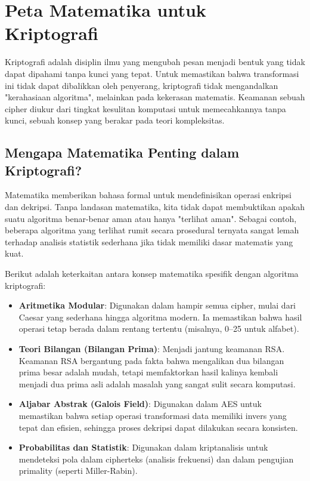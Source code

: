 \section{Peta Matematika untuk Kriptografi}

Kriptografi adalah disiplin ilmu yang mengubah pesan menjadi bentuk yang tidak dapat dipahami tanpa kunci yang tepat. Untuk memastikan bahwa transformasi ini tidak dapat dibalikkan oleh penyerang, kriptografi tidak mengandalkan "kerahasiaan algoritma", melainkan pada kekerasan matematis. Keamanan sebuah cipher diukur dari tingkat kesulitan komputasi untuk memecahkannya tanpa kunci, sebuah konsep yang berakar pada teori kompleksitas.

\subsection{Mengapa Matematika Penting dalam Kriptografi?}

Matematika memberikan bahasa formal untuk mendefinisikan operasi enkripsi dan dekripsi. Tanpa landasan matematika, kita tidak dapat membuktikan apakah suatu algoritma benar-benar aman atau hanya "terlihat aman". Sebagai contoh, beberapa algoritma yang terlihat rumit secara prosedural ternyata sangat lemah terhadap analisis statistik sederhana jika tidak memiliki dasar matematis yang kuat.

Berikut adalah keterkaitan antara konsep matematika spesifik dengan algoritma kriptografi:
\begin{itemize}
  \item \textbf{Aritmetika Modular}: Digunakan dalam hampir semua cipher, mulai dari Caesar yang sederhana hingga algoritma modern. Ia memastikan bahwa hasil operasi tetap berada dalam rentang tertentu (misalnya, 0--25 untuk alfabet).
  \item \textbf{Teori Bilangan (Bilangan Prima)}: Menjadi jantung keamanan RSA. Keamanan RSA bergantung pada fakta bahwa mengalikan dua bilangan prima besar adalah mudah, tetapi memfaktorkan hasil kalinya kembali menjadi dua prima asli adalah masalah yang sangat sulit secara komputasi.
  \item \textbf{Aljabar Abstrak (Galois Field)}: Digunakan dalam AES untuk memastikan bahwa setiap operasi transformasi data memiliki invers yang tepat dan efisien, sehingga proses dekripsi dapat dilakukan secara konsisten.
  \item \textbf{Probabilitas dan Statistik}: Digunakan dalam kriptanalisis untuk mendeteksi pola dalam cipherteks (analisis frekuensi) dan dalam pengujian primality (seperti Miller-Rabin).
\end{itemize}

